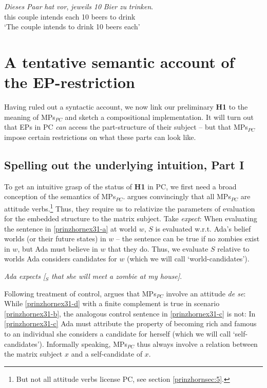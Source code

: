 \documentclass[output=paper,colorlinks,citecolor=brown,
]{langscibook}
\begin{document}
\ea \label{prinzhornex20}
\gll \textit{Dieses} \textit{Paar} \textit{hat} \textit{vor}, \textit{jeweils} \textit{10} \textit{Bier} \textit{zu} \textit{trinken}.\\
this couple intends {} each 10 beers to drink\\
\glt `The couple intends to drink 10 beers each' 
\z












\section{ A tentative semantic account of the EP-restriction}\label{prinzhornsec:4}

Having ruled out a syntactic account, we now link our preliminary \textbf{H1} to the meaning of MPs$_{PC}$ and sketch a compositional implementation. It will turn out that EPs in PC \textit{can} access the part-structure of their subject -- but that MPs$_{PC}$ impose certain restrictions on what these parts can look like.



\subsection{Spelling out the underlying intuition, Part I}\label{prinzhornsec:4.1}

To get an intuitive grasp of the status of {\bf H1} in PC, we first need a broad conception of the semantics of MPs$_{PC}$. \cite{Pearson:2016} argues convincingly that all MPs$_{PC}$ are attitude verbs.\footnote{But not all attitude verbs license PC, see section \ref{prinzhornsec:5}. } Thus, they require us to relativize the parameters of evaluation for the embedded structure to the matrix subject. Take \textit{expect}: When evaluating the sentence in \ref{prinzhornex31-a} at world $w$, $S$ is evaluated w.r.t. Ada's belief worlds (or their future states) in $w$ -- the sentence can be true if no zombies exist in $w$, but Ada must believe in $w$ that they do. Thus, we evaluate $S$ relative to worlds  Ada considers candidates for $w$ (which we will call `world-candidates').

\ea  \label{prinzhornex31-a} \textit{Ada expects [$_{S}$ that she will meet a zombie at my house]}. \z

Following  \cite{Chierchia:1989} treatment of control, \cite{Pearson:2016} argues that MPs$_{PC}$ involve an attitude \textit{de se}: While \ref{prinzhornex31-d} with a finite complement is true in scenario \ref{prinzhornex31-b}, the analogous control sentence  in \ref{prinzhornex31-c} is not: In \ref{prinzhornex31-c} Ada must attribute the property of becoming rich and famous to an individual she considers a candidate for herself (which we will call `self-candidates'). Informally speaking, MPs$_{PC}$ thus always involve a relation between the matrix subject $x$ and a self-candidate of $x$.
\end{document}
